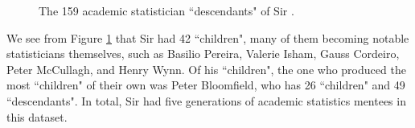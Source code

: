 \documentclass[article,shortnames]{jss}
\begin{document}
\begin{figure}%
    \centering
    \caption{The 159 academic statistician ``descendants" of Sir .}
    \label{fig:dCox}
\end{figure}

We see from Figure \ref{fig:dCox} that Sir  had 42 ``children", many of them becoming notable statisticians themselves, such as Basilio Pereira, Valerie Isham, Gauss Cordeiro, Peter McCullagh, and Henry Wynn. Of his ``children", the one who produced the most ``children" of their own was Peter Bloomfield, who has 26 ``children" and 49 ``descendants". In total, Sir  had five generations of academic statistics mentees in this dataset.
\end{document}
